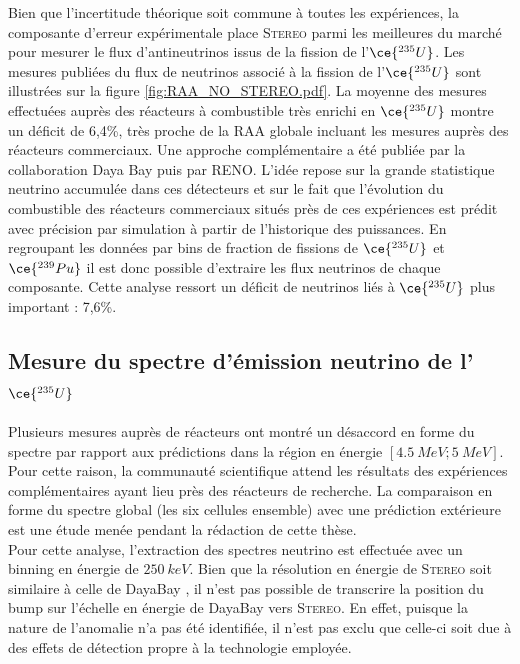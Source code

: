 \bigbreak

Bien que l'incertitude théorique soit commune à toutes les expériences, la composante d'erreur expérimentale place \textsc{Stereo} parmi les meilleures du marché pour mesurer le flux d'antineutrinos issus de la fission de l'$\ce{^{235}U}$. Les mesures publiées du flux de neutrinos associé à la fission de l'$\ce{^{235}U}$ sont illustrées sur la figure \ref{fig:RAA_NO_STEREO.pdf}. La moyenne des mesures effectuées auprès des réacteurs à combustible très enrichi en $\ce{^{235}U}$ montre un déficit de 6,4\%, très proche de la RAA globale incluant les mesures auprès des réacteurs commerciaux. Une approche complémentaire a été publiée par la collaboration Daya Bay puis par RENO. L'idée repose sur la grande statistique neutrino accumulée dans ces détecteurs et sur le fait que l'évolution du combustible des réacteurs commerciaux situés près de ces expériences est prédit avec précision par simulation à partir de l'historique des puissances. En regroupant les données par bins de fraction de fissions de $\ce{^{235}U}$ et $\ce{^{239}Pu}$ il est donc possible d'extraire les flux neutrinos de chaque composante. Cette analyse ressort un déficit de neutrinos liés à $\ce{^{235}U}$ plus important : 7,6\%.\\

\bigbreak

\subsection{Mesure du spectre d'émission neutrino de l'$\ce{^{235}U}$}

Plusieurs mesures auprès de réacteurs ont montré un désaccord en forme du spectre par rapport aux prédictions dans la région en énergie $[\SI{4.5}{MeV}; \SI{5}{MeV}]$. Pour cette raison, la communauté scientifique attend les résultats des expériences complémentaires ayant lieu près des réacteurs de recherche. La comparaison en forme du spectre global (les six cellules ensemble) avec une prédiction extérieure est une étude menée pendant la rédaction de cette thèse.\\

Pour cette analyse, l'extraction des spectres neutrino est effectuée avec un binning en énergie de $\SI{250}{keV}$. Bien que la résolution en énergie de \textsc{Stereo} soit similaire à celle de DayaBay \cite{DayaBay:2012aa}, il n'est pas possible de transcrire la position du bump sur l'échelle en énergie de DayaBay vers \textsc{Stereo}. En effet, puisque la nature de l'anomalie n'a pas été identifiée, il n'est pas exclu que celle-ci soit due à des effets de détection propre à la technologie employée.\\

